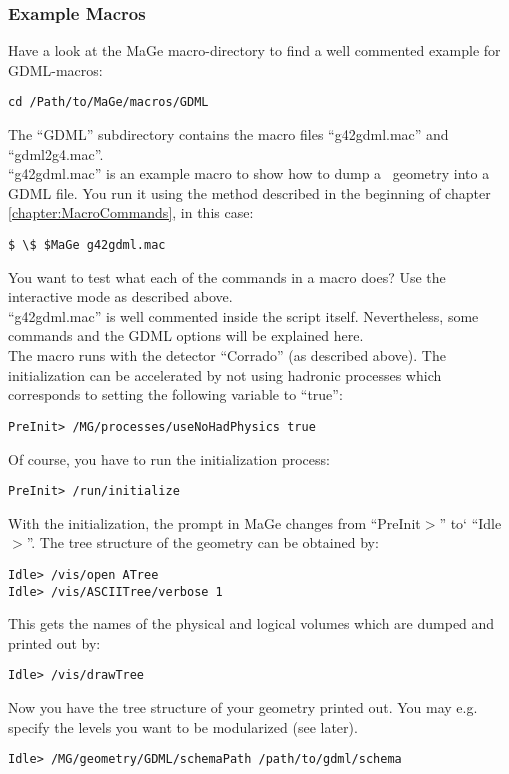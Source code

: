 \subsubsection{Example Macros}
Have a look at the MaGe macro-directory to find a well commented example for GDML-macros:
\begin{lstlisting}
cd /Path/to/MaGe/macros/GDML
\end{lstlisting}
The ``GDML''  subdirectory contains the macro files ``g42gdml.mac'' and ``gdml2g4.mac''.\\
``g42gdml.mac'' is an example macro to show how to dump a \geant \ geometry into a GDML file.
You run it using the method described in the beginning of chapter \ref{chapter:MacroCommands}, in this case:
\begin{lstlisting}
$ \$ $MaGe g42gdml.mac
\end{lstlisting}
You want to test what each of the commands in a macro does? Use the interactive mode as described above.\\
``g42gdml.mac'' is well commented inside the script itself. Nevertheless, some commands and the GDML options will be explained here.\\
The macro runs with the detector ``Corrado'' (as described above).
The initialization can be accelerated by not using hadronic processes which corresponds to setting the following variable to ``true'':
\begin{lstlisting}
PreInit> /MG/processes/useNoHadPhysics true 
\end{lstlisting}
Of course, you have to run the initialization process:
\begin{lstlisting}
PreInit> /run/initialize
\end{lstlisting}
With the initialization, the prompt in MaGe changes from ``PreInit$>$'' to` ``Idle$>$''.
The tree structure of the geometry can be obtained by:
\begin{lstlisting}
Idle> /vis/open ATree
Idle> /vis/ASCIITree/verbose 1
\end{lstlisting}
This gets the names of the physical and logical volumes which are dumped and printed out by:
\begin{lstlisting}
Idle> /vis/drawTree
\end{lstlisting}
Now you have the tree structure of your geometry printed out. You may e.g. specify the levels you want to be modularized (see later).
\begin{lstlisting}
Idle> /MG/geometry/GDML/schemaPath /path/to/gdml/schema
\end{lstlisting}
